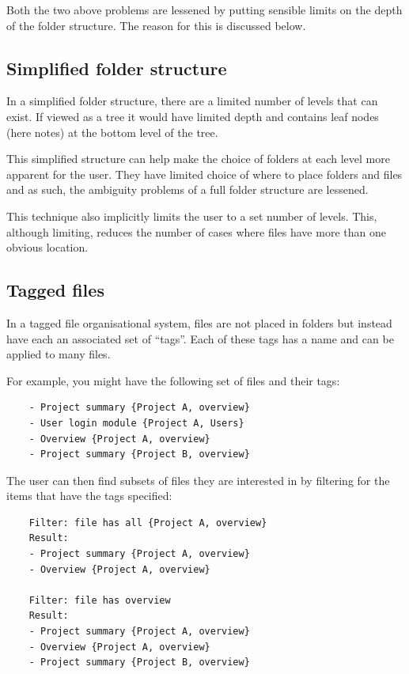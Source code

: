 Both the two above problems are lessened by putting sensible limits on
the depth of the folder structure. The reason for this is discussed
below.

\subsection{Simplified folder structure}\label{simplified-folder-structure}

In a simplified folder structure, there are a limited number of levels that can
exist. If viewed as a tree it would have limited depth and contains leaf nodes
(here notes) at the bottom level of the tree.

This simplified structure can help make the choice of folders at each
level more apparent for the user. They have limited choice of
where to place folders and files and as such, the ambiguity problems of a
full folder structure are lessened.

This technique also implicitly limits the user to a set number of
levels. This, although limiting, reduces the number of cases where files have
 more than one obvious location.

\subsection{Tagged files}\label{tagged-files}

In a tagged file organisational system, files are not placed in folders
but instead have each an associated set of ``tags''. Each of these tags
has a name and can be applied to many files.

For example, you might have the following set of files and their tags:

\begin{verbatim}
    - Project summary {Project A, overview}
    - User login module {Project A, Users}
    - Overview {Project A, overview}
    - Project summary {Project B, overview}
\end{verbatim}

The user can then find subsets of files they are interested in by
filtering for the items that have the tags specified:

\begin{verbatim}
    Filter: file has all {Project A, overview}
    Result:
    - Project summary {Project A, overview}
    - Overview {Project A, overview}

    Filter: file has overview
    Result:
    - Project summary {Project A, overview}
    - Overview {Project A, overview}
    - Project summary {Project B, overview}
\end{verbatim}

